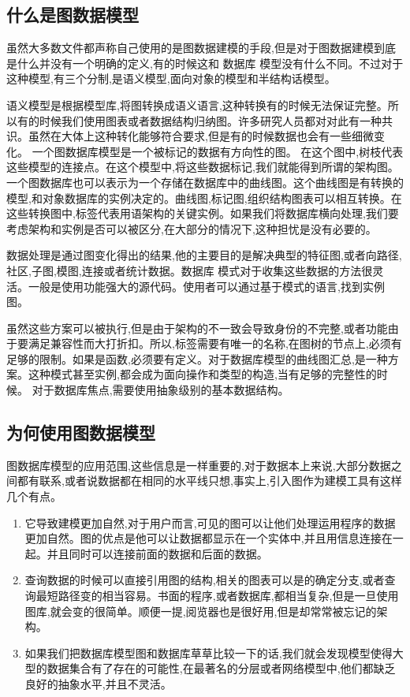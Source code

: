 \documentclass[a4paper]{ecust_thesis_translation}
\begin{document}
	\subsection{什么是图数据模型}
		虽然大多数文件都声称自己使用的是图数据建模的手段,但是对于图数据建模到底是什么并没有一个明确的定义,有的时候这和 数据库 模型没有什么不同。不过对于这种模型,有三个分制,是语义模型,面向对象的模型和半结构话模型。
	
		语义模型是根据模型库,将图转换成语义语言,这种转换有的时候无法保证完整。所以有的时候我们使用图表或者数据结构归纳图。许多研究人员都对对此有一种共识。虽然在大体上这种转化能够符合要求,但是有的时候数据也会有一些细微变化。
		一个图数据库模型是一个被标记的数据有方向性的图。 在这个图中,树枝代表这些模型的连接点。在这个模型中,将这些数据标记,我们就能得到所谓的架构图。一个图数据库也可以表示为一个存储在数据库中的曲线图。这个曲线图是有转换的模型,和对象数据库的实例决定的。曲线图,标记图,组织结构图表可以相互转换。在这些转换图中,标签代表用语架构的关键实例。如果我们将数据库横向处理,我们要考虑架构和实例是否可以被区分,在大部分的情况下,这种担忧是没有必要的。
		
		数据处理是通过图变化得出的结果,他的主要目的是解决典型的特征图,或者向路径,社区,子图,模图,连接或者统计数据。数据库 模式对于收集这些数据的方法很灵活。一般是使用功能强大的源代码。使用者可以通过基于模式的语言,找到实例图。	

		虽然这些方案可以被执行,但是由于架构的不一致会导致身份的不完整,或者功能由于要满足兼容性而大打折扣。所以,标签需要有唯一的名称,在图树的节点上,必须有足够的限制。如果是函数,必须要有定义。对于数据库模型的曲线图汇总,是一种方案。这种模式甚至实例,都会成为面向操作和类型的构造,当有足够的完整性的时候。	对于数据库焦点,需要使用抽象级别的基本数据结构。
	\subsection{为何使用图数据模型}
		图数据库模型的应用范围,这些信息是一样重要的,对于数据本上来说,大部分数据之间都有联系,或者说数据都在相同的水平线只想,事实上,引入图作为建模工具有这样几个有点。	
		\begin{enumerate}
			\item 它导致建模更加自然,对于用户而言,可见的图可以让他们处理运用程序的数据更加自然。图的优点是他可以让数据都显示在一个实体中,并且用信息连接在一起。并且同时可以连接前面的数据和后面的数据。	
			\item 查询数据的时候可以直接引用图的结构,相关的图表可以是的确定分支,或者查询最短路径变的相当容易。书面的程序,或者数据库,都相当复杂,但是一旦使用图库,就会变的很简单。顺便一提,阅览器也是很好用,但是却常常被忘记的架构。	
			\item 如果我们把数据库模型图和数据库草草比较一下的话,我们就会发现模型使得大型的数据集合有了存在的可能性,在最著名的分层或者网络模型中,他们都缺乏良好的抽象水平,并且不灵活。	
		\end{enumerate}
\end{document}
